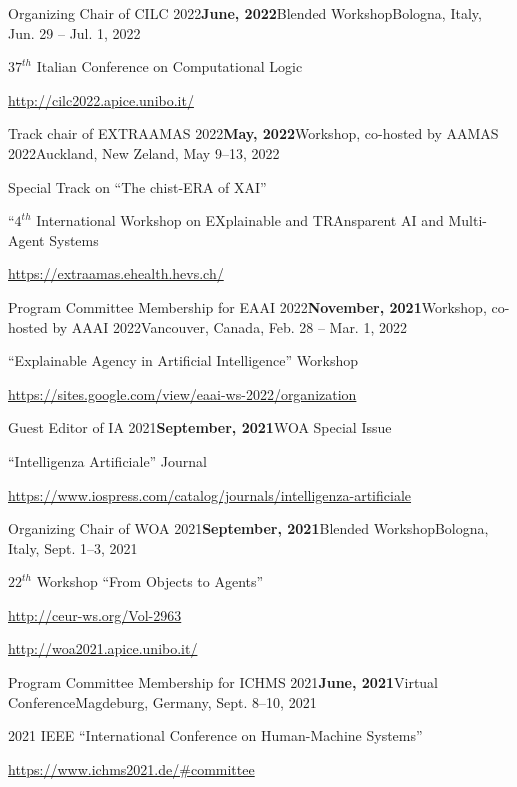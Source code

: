 \begin{activity}{Organizing Chair of CILC 2022}{\textbf{June, 2022}}{Blended Workshop}{Bologna, Italy, Jun. 29 -- Jul. 1, 2022}
    \item $37^{th}$ Italian Conference on Computational Logic
    \item \url{http://cilc2022.apice.unibo.it/}
\end{activity}

\begin{activity}{Track chair of EXTRAAMAS 2022}{\textbf{May, 2022}}{Workshop, co-hosted by AAMAS 2022}{Auckland, New Zeland, May 9--13, 2022}
    \item Special Track on ``The chist-ERA of XAI''
    \item ``$4^{th}$ International Workshop on EXplainable and TRAnsparent AI and Multi-Agent Systems
    \item \url{https://extraamas.ehealth.hevs.ch/}
\end{activity}

\begin{activity}{Program Committee Membership for EAAI 2022}{\textbf{November, 2021}}{Workshop, co-hosted by AAAI 2022}{Vancouver, Canada, Feb. 28 -- Mar. 1, 2022}
    \item ``Explainable Agency in Artificial Intelligence'' Workshop
    \item \url{https://sites.google.com/view/eaai-ws-2022/organization}
\end{activity}

\begin{activity}{Guest Editor of IA 2021}{\textbf{September, 2021}}{WOA Special Issue}{}
    \item ``Intelligenza Artificiale'' Journal
    \item \url{https://www.iospress.com/catalog/journals/intelligenza-artificiale}
\end{activity}

\begin{activity}{Organizing Chair of WOA 2021}{\textbf{September, 2021}}{Blended Workshop}{Bologna, Italy, Sept. 1--3, 2021}
    \item $22^{th}$ Workshop ``From Objects to Agents''
    \item \url{http://ceur-ws.org/Vol-2963}
    \item \url{http://woa2021.apice.unibo.it/}
\end{activity}

\begin{activity}{Program Committee Membership for ICHMS 2021}{\textbf{June, 2021}}{Virtual Conference}{Magdeburg, Germany, Sept. 8--10, 2021}
    \item 2021 IEEE ``International Conference on Human-Machine Systems''
    \item \url{https://www.ichms2021.de/#committee}
\end{activity}

